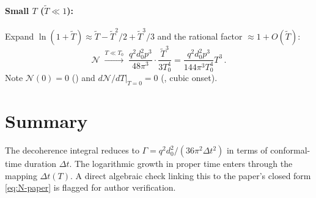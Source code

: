 \documentclass[12pt]{article}
\newcommand{\Nnum}{\mathcal{N}}
\begin{document}
\paragraph{Small $T$ ($\widetilde{T}\ll 1$):}
Expand $\ln(1+\widetilde{T})\approx\widetilde{T}-\widetilde{T}^{2}/2+\widetilde{T}^{3}/3$ and the
rational factor $\approx 1+O(\widetilde{T})$:
%
\begin{equation}
  \Nnum \;\xrightarrow{T\ll T_{0}}\;
  \frac{q^{2}d_{0}^{2}p^{3}}{48\pi^{3}}
  \cdot\frac{\widetilde{T}^{3}}{3T_{0}^{4}}
  =
  \frac{q^{2}d_{0}^{2}p^{3}}{144\pi^{3}T_{0}^{4}}T^{3} \,.
\end{equation}
%
Note $\Nnum(0)=0$ (\checkmark) and $d\Nnum/dT|_{T=0}=0$ (\checkmark, cubic onset).

\section*{Summary}

The decoherence integral reduces to $\Gamma = q^{2}d_{0}^{2}/(36\pi^{2}\Delta t^{2})$
in terms of conformal-time duration $\Delta t$.  The logarithmic growth in proper time
enters through the mapping $\Delta t(T)$.  A direct algebraic check linking this to
the paper's closed form \eqref{eq:N-paper} is flagged for author verification.
\end{document}
